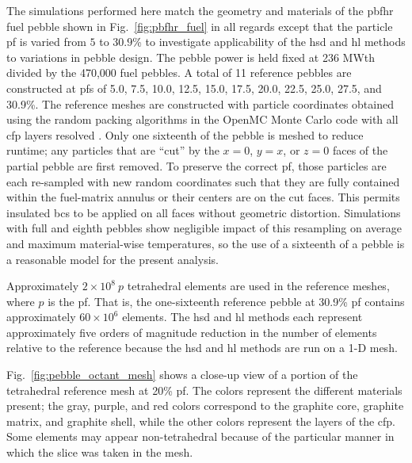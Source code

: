 The simulations performed here match the geometry and materials of the \gls{pbfhr} fuel pebble shown in Fig.\ \ref{fig:pbfhr_fuel} in all regards except that the particle \gls{pf} is varied from \(5\) to \(30.9\)\% to investigate applicability of the \gls{hsd} and \gls{hl} methods to variations in pebble design. The pebble power is held fixed at 236 MWth divided by the 470,000 fuel pebbles. A total of 11 reference pebbles are constructed at \glspl{pf} of 5.0, 7.5, 10.0, 12.5, 15.0, 17.5, 20.0, 22.5, 25.0, 27.5, and 30.9\%. The reference meshes are constructed with particle coordinates obtained using the random packing algorithms in the OpenMC Monte Carlo code with all \gls{cfp} layers resolved \cite{jodrey}. Only one sixteenth of the pebble is meshed to reduce runtime; any particles that are ``cut'' by the \(x=0\), \(y=x\), or \(z=0\) faces of the partial pebble are first removed. To preserve the correct \gls{pf}, those particles are each re-sampled with new random coordinates such that they are fully contained within the fuel-matrix annulus or their centers are on the cut faces. This permits insulated \glspl{bc} to be applied on all faces without geometric distortion. Simulations with full and eighth pebbles show negligible impact of this resampling on average and maximum material-wise temperatures, so the use of a sixteenth of a pebble is a reasonable model for the present analysis. 

Approximately \(2\times10^8\ p\) tetrahedral elements are used in the reference meshes, where \(p\) is the \gls{pf}. That is, the one-sixteenth reference pebble at 30.9\% \gls{pf} contains approximately \(60\times10^6\) elements. The \gls{hsd} and \gls{hl} methods each represent approximately five orders of magnitude reduction in the number of elements relative to the reference because the \gls{hsd} and \gls{hl} methods are run on a 1-D mesh.

Fig.\ \ref{fig:pebble_octant_mesh} shows a close-up view of a portion of the tetrahedral reference mesh at 20\% \gls{pf}. The colors represent the different materials present; the gray, purple, and red colors correspond to the graphite core, graphite matrix, and graphite shell, while the other colors represent the layers of the \gls{cfp}. Some elements may appear non-tetrahedral because of the particular manner in which the slice was taken in the mesh.

